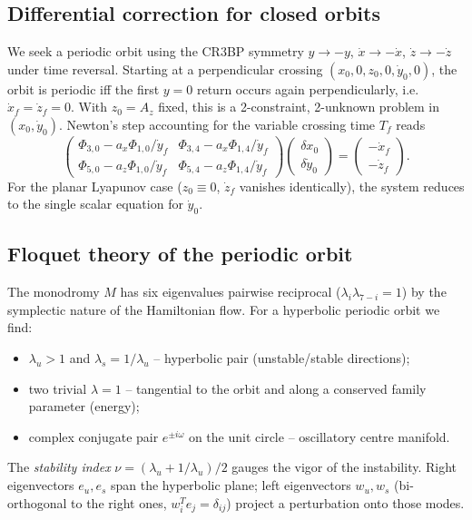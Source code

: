 \documentclass[11pt,a4paper]{article}
\begin{document}
\subsection{Differential correction for closed orbits}
We seek a periodic orbit using the CR3BP symmetry $y \to -y$, $\dot x \to -\dot x$, $\dot z \to -\dot z$ under time reversal. Starting at a perpendicular crossing $(x_0,0,z_0,0,\dot y_0,0)$, the orbit is periodic iff the first $y=0$ return occurs again perpendicularly, i.e.\ $\dot x_f = \dot z_f = 0$. With $z_0 = A_z$ fixed, this is a 2-constraint, 2-unknown problem in $(x_0, \dot y_0)$. Newton's step accounting for the variable crossing time $T_f$ reads
\begin{equation}
\label{eq:dc}
\begin{pmatrix}
\Phi_{3,0} - a_x\Phi_{1,0}/\dot y_f & \Phi_{3,4} - a_x\Phi_{1,4}/\dot y_f \\
\Phi_{5,0} - a_z\Phi_{1,0}/\dot y_f & \Phi_{5,4} - a_z\Phi_{1,4}/\dot y_f
\end{pmatrix}
\begin{pmatrix} \delta x_0 \\ \delta \dot y_0 \end{pmatrix}
=
\begin{pmatrix} -\dot x_f \\ -\dot z_f \end{pmatrix}.
\end{equation}
For the planar Lyapunov case ($z_0 \equiv 0$, $\dot z_f$ vanishes identically), the system reduces to the single scalar equation for $\dot y_0$.

\subsection{Floquet theory of the periodic orbit}
The monodromy $M$ has six eigenvalues pairwise reciprocal ($\lambda_i \lambda_{7-i} = 1$) by the symplectic nature of the Hamiltonian flow. For a hyperbolic periodic orbit we find:
\begin{itemize}
  \item $\lambda_u > 1$ and $\lambda_s = 1/\lambda_u$ -- hyperbolic pair (unstable/stable directions);
  \item two trivial $\lambda = 1$ -- tangential to the orbit and along a conserved family parameter (energy);
  \item complex conjugate pair $e^{\pm i \omega}$ on the unit circle -- oscillatory centre manifold.
\end{itemize}
The \emph{stability index} $\nu = (\lambda_u + 1/\lambda_u)/2$ gauges the vigor of the instability. Right eigenvectors $e_u, e_s$ span the hyperbolic plane; left eigenvectors $w_u, w_s$ (bi-orthogonal to the right ones, $w_i^T e_j = \delta_{ij}$) project a perturbation onto those modes.
\end{document}
